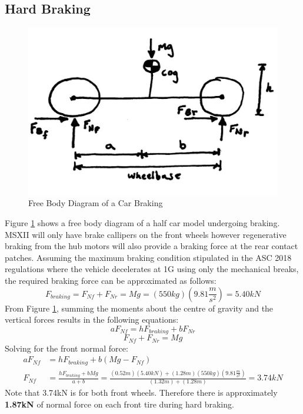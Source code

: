 \documentclass[12pt]{article}
\begin{document}
\subsection{Hard Braking}
\label{sec:hardBraking}
\begin{figure}[h!]
	\centering
	\includegraphics[width=.5\textwidth]{./LaTex/brakingFBD.jpg}
	\caption{Free Body Diagram of a Car Braking}
	\label{fig:barkingFBD}
\end{figure}
Figure \ref{fig:barkingFBD} shows a free body diagram of a half car model undergoing braking. MSXII will only have brake callipers on the front wheels however regenerative braking from the hub motors will also provide a braking force at the rear contact patches. Assuming the maximum braking condition stipulated in the ASC 2018 regulations where the vehicle decelerates at 1G using only the mechanical breaks, the required braking force can be approximated as follows: 
\begin{equation}
	F_{braking} = F_{Nf} + F_{Nr} = Mg = (550kg)\left(9.81\frac{m}{s^2}\right) = 5.40kN
\end{equation}
From Figure \ref{fig:barkingFBD}, summing the moments about the centre of gravity and the vertical forces results in the following equations: 
\begin{equation}
	aF_{Nf} = hF_{braking} + bF_{Nr}
\end{equation}
\begin{equation}
	F_{Nf} + F_{Nr} = Mg
\end{equation}
Solving for the front normal force: 
\begin{equation}
\begin{split}
	aF_{Nf} &= hF_{braking} + b(Mg - F_{Nf})\\
	F_{Nf} &= \frac{hF_{braking} + bMg}{a+b} = \frac{(0.52m)(5.40kN)+(1.28m)(550kg)\left(9.81\frac{m}{s^2}\right)}{(1.32m)+(1.28m)} = 3.74kN
\end{split}
\end{equation}
Note that 3.74kN is for both front wheels. Therefore there is approximately \textbf{1.87kN} of normal force on each front tire during hard braking. 
\end{document}
